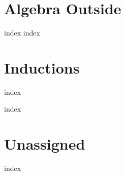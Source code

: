 \documentclass[12pt,twoside,letterpaper]{memoir}
\begin{document}
\vspace*{\fill}
\newpage
%
\cleardoublepage

%




% 
% 
\cleardoublepage


\tableofcontents
\cleardoublepage

% 
\cleardoublepage


\mainmatter%


\part{Algebra Outside}
{index}
{index}

\part{Inductions}
{index}

{index}

\part{Unassigned}
{index}
% 
% 
% 
% 

% 

% 
% 

\appendix



\backmatter%



% 



\printindex

\end{document}
